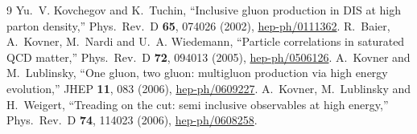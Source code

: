 \documentclass[11pt]{article}
\begin{document}
\begin{thebibliography}{9}
 Yu.~V. Kovchegov and K.~Tuchin, ``Inclusive gluon production in DIS at high parton density,'' Phys.\ Rev.\ D \textbf{65}, 074026 (2002), \href{https://arxiv.org/abs/hep-ph/0111362}{hep-ph/0111362}.
 R.~Baier, A.~Kovner, M.~Nardi and U.~A. Wiedemann, ``Particle correlations in saturated QCD matter,'' Phys.\ Rev.\ D \textbf{72}, 094013 (2005), \href{https://arxiv.org/abs/hep-ph/0506126}{hep-ph/0506126}.
 A.~Kovner and M.~Lublinsky, ``One gluon, two gluon: multigluon production via high energy evolution,'' JHEP \textbf{11}, 083 (2006), \href{https://arxiv.org/abs/hep-ph/0609227}{hep-ph/0609227}.
 A.~Kovner, M.~Lublinsky and H.~Weigert, ``Treading on the cut: semi inclusive observables at high energy,'' Phys.\ Rev.\ D \textbf{74}, 114023 (2006), \href{https://arxiv.org/abs/hep-ph/0608258}{hep-ph/0608258}.
\end{thebibliography}
\end{document}

